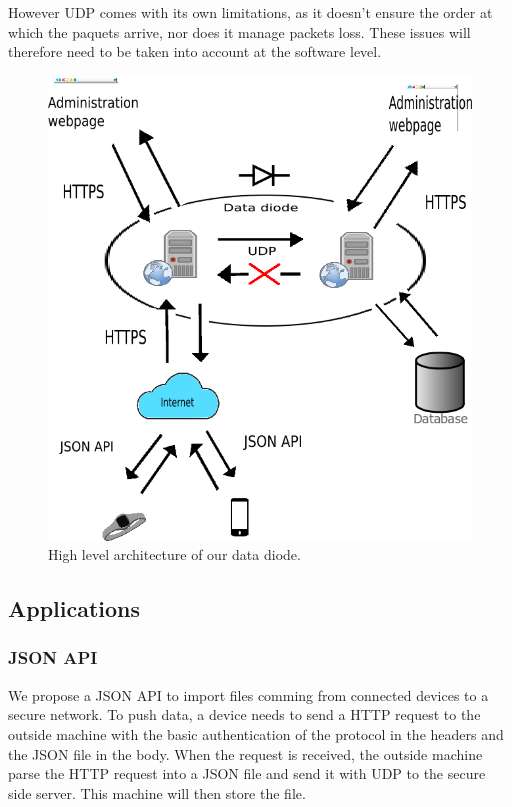 \documentclass[a4paper,11pt]{article}
\begin{document}
However UDP comes with its own limitations, as it doesn't ensure the order at which the paquets arrive, nor does it manage packets loss. These issues will therefore need to be taken into account at the software level.\\


\begin{figure}
	\includegraphics[scale=0.7]{img/system.png}
	\caption{High level architecture of our data diode.}
\end{figure}


\subsection{Applications}
\subsubsection{JSON API}
We propose a JSON API to import files comming from connected devices to a secure network. To push data, a device needs to send a HTTP request to the outside machine with the basic authentication of the protocol in the headers and the JSON file in the body. When the request is received, the outside machine parse the HTTP request into a JSON file and send it with UDP to the secure side server. This machine will then store the file.
\end{document}
